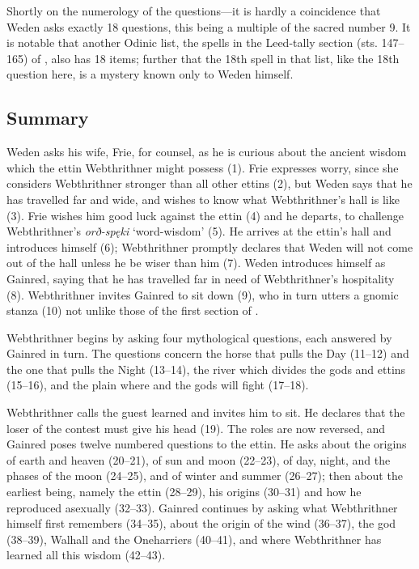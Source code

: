 Shortly on the numerology of the questions—it is hardly a coincidence that Weden asks exactly 18 questions, this being a multiple of the sacred number 9.  It is notable that another Odinic list, the spells in the Leed-tally section (sts. 147–165) of \Havamal, also has 18 items; further that the 18th spell in that list, like the 18th question here, is a mystery known only to Weden himself.

\subsection{Summary}

Weden asks his wife, Frie, for counsel, as he is curious about the ancient wisdom which the ettin Webthrithner might possess (1). Frie expresses worry, since she considers Webthrithner stronger than all other ettins (2), but Weden says that he has travelled far and wide, and wishes to know what Webthrithner’s hall is like (3).  Frie wishes him good luck against the ettin (4) and he departs, to challenge Webthrithner’s \emph{orð-spęki} ‘word-wisdom’ (5). He arrives at the ettin’s hall and introduces himself (6); Webthrithner promptly declares that Weden will not come out of the hall unless he be wiser than him (7).  Weden introduces himself as Gainred, saying that he has travelled far in need of Webthrithner’s hospitality (8).  Webthrithner invites Gainred to sit down (9), who in turn utters a gnomic stanza (10) not unlike those of the first section of \Havamal.

Webthrithner begins by asking four mythological questions, each answered by Gainred in turn. The questions concern the horse that pulls the Day (11–12) and the one that pulls the Night (13–14), the river which divides the gods and ettins (15–16), and the plain where  and the gods will fight (17–18).

Webthrithner calls the guest learned and invites him to sit.  He declares that the loser of the contest must give his head (19).  The roles are now reversed, and Gainred poses twelve numbered questions to the ettin.  He asks about the origins of earth and heaven (20–21), of sun and moon (22–23), of day, night, and the phases of the moon (24–25), and of winter and summer (26–27); then about the earliest being, namely the ettin  (28–29), his origins (30–31) and how he reproduced asexually (32–33). Gainred continues by asking what Webthrithner himself first remembers (34–35), about the origin of the wind (36–37), the god  (38–39), Walhall and the Oneharriers (40–41), and where Webthrithner has learned all this wisdom (42–43).

